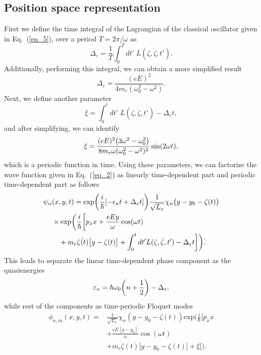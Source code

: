 \subsection{Position space representation}

First we define the time integral of the Lagrangian of the classical oscillator given in Eq.~(\ref{eq_5}), over a period $T=2\pi/\omega$ as
\begin{equation} \label{eq_b1}
  \Delta_{\varepsilon} = \frac{1}{T} \int_0^T dt' \; L(\zeta,\dot{\zeta},t').
\end{equation}
Additionally, performing this integral, we can obtain a more simplified result
\begin{equation} \label{eq_b2}
  \Delta_{\varepsilon} = \frac{(eE)^2}{4m_e(\omega_0^2 - \omega^2)}.
\end{equation}
Next, we define another parameter
\begin{equation} \label{eq_b3}
  \xi =
  \int_0^t dt' \; L(\zeta,\dot{\zeta},t') -
  \Delta_{\varepsilon} t,
\end{equation}
and after simplifying, we can identify
\begin{equation} \label{eq_b4}
  \xi =
  \frac{(eE)^2\qty(3\omega^2 - \omega_0^2)}{8m_e\omega(\omega_0^2 - \omega^2)^2} \sin(2\omega t),
\end{equation}
which is a periodic function in time. Using these parameters, we can factorize the wave function given in Eq.~(\ref{eq_2}) as linearly time-dependent part and periodic time-dependent part as follows
\begin{equation} \label{eq_b5}
  \begin{aligned}
    \psi_{\alpha}&(x,y,t)  =
    \exp(\frac{i}{\hbar}\qty[-\epsilon_nt + \Delta_{\varepsilon} t ])
    \frac{1}{\sqrt{L_x}} \chi_n\big(y - y_0 - \zeta(t)\big)
    \\
    & \times
    \text{exp}\bigg(
     \frac{i}{\hbar}\bigg[
     p_x x +
     \frac{eEy}{\omega}\cos(\omega t) \\
     & \quad+
     m_e\dot{\zeta(t)}\big[y-\zeta(t)\big]
     + \int_0^{t}dt'L(\zeta,\dot{\zeta},t') - \Delta_{\varepsilon} t  \bigg]
     \bigg).
  \end{aligned}
\end{equation}
This leads to separate the linear time-dependent phase component as the quasienergies
\begin{equation} \label{eq_b6}
  \varepsilon_{n} =
  \hbar \omega_0\qty(n + \frac{1}{2}) - \Delta_{\varepsilon},
\end{equation}
while rest of the components as time-periodic Floquet modes
\begin{equation} \label{eq_b7}
  \begin{aligned}
    \phi_{n,m}(x,y,t) =  &
    \frac{1}{\sqrt{L_x}} \chi_{n}\left(y - y_0 - \zeta(t)\right)
    \text{exp}\bigg(
     \frac{i}{\hbar}\bigg[
     p_x x \\
     & +
     \frac{eE[y - y_0]}{\omega}\cos(\omega t) \\
     & +
     m_e\dot{\zeta}(t)\big[y - y_0 -\zeta(t)\big]
     + \xi \bigg]\bigg).
  \end{aligned}
\end{equation}

